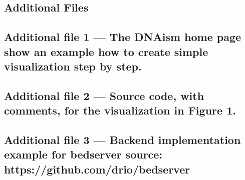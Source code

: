 \documentclass[twocolumn]{bmcart}
\begin{document}
\begin{backmatter}



\section*{Additional Files}
\subsection*{Additional file 1 --- The DNAism home page show an example how to create simple visualization step by step.}
\subsection*{Additional file 2 --- Source code, with comments, for the visualization in Figure 1.}
\subsection*{Additional file 3 --- Backend implementation example for bedserver source: https://github.com/drio/bedserver}


\end{backmatter}
\end{document}
